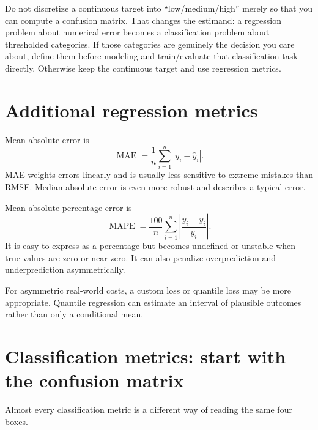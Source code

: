 \begin{pitfall}
Do not discretize a continuous target into ``low/medium/high'' merely so that you can compute a confusion matrix. That changes the estimand: a regression problem about numerical error becomes a classification problem about thresholded categories. If those categories are genuinely the decision you care about, define them before modeling and train/evaluate that classification task directly. Otherwise keep the continuous target and use regression metrics.
\end{pitfall}

\section{Additional regression metrics}

Mean absolute error is
\[
  \operatorname{MAE}
  =\frac{1}{n}\sum_{i=1}^{n}|y_i-\hat{y}_i|.
\]
MAE weights errors linearly and is usually less sensitive to extreme mistakes than RMSE\@. Median absolute error is even more robust and describes a typical error.

Mean absolute percentage error is
\[
  \operatorname{MAPE}
  =\frac{100}{n}\sum_{i=1}^{n}
  \left|\frac{y_i-\hat{y}_i}{y_i}\right|.
\]
It is easy to express as a percentage but becomes undefined or unstable when true values are zero or near zero. It can also penalize overprediction and underprediction asymmetrically.

For asymmetric real-world costs, a custom loss or quantile loss may be more appropriate. Quantile regression can estimate an interval of plausible outcomes rather than only a conditional mean.

\section{Classification metrics: start with the confusion matrix}
\label{sec:classification-metrics}

Almost every classification metric is a different way of reading the same four boxes.


